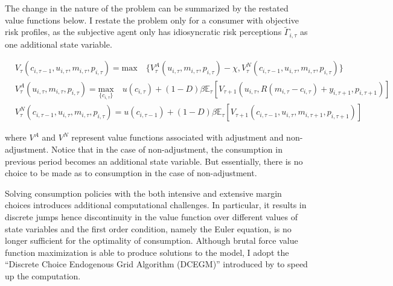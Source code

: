 The change in the nature of the problem can be summarized by the restated value functions below. I restate the problem only for a consumer with objective risk profiles, as the subjective agent only has idiosyncratic risk perceptions $\tilde \Gamma_{i,\tau}$ as one additional state variable. 

\begin{equation}
\begin{split}
& V_{\tau}(c_{i,\tau-1},u_{i,\tau}, m_{i,\tau}, p_{i,\tau}) = \textrm{max} \quad \{V^A_{\tau}(u_{i,\tau}, m_{i,\tau}, p_{i,\tau})-\chi,V^N_{\tau}(c_{i,\tau-1},u_{i,\tau}, m_{i,\tau}, p_{i,\tau})\} \\
& V^A_{\tau}(u_{i,\tau}, m_{i,\tau}, p_{i,\tau}) = \underset{\{c_{i,\tau}\}}{\textrm{max}} \quad u(c_{i,\tau}) + (1-D)\beta \mathbb{E}_{\tau}\left[V_{\tau+1}(u_{i,\tau},R(m_{i,\tau}-c_{i,\tau})+y_{i,\tau+1}, p_{i,\tau+1})\right]  \\
& V^N_{\tau}(c_{i,\tau-1},u_{i,\tau}, m_{i,\tau}, p_{i,\tau}) =  u(c_{i,\tau-1}) + (1-D)\beta \mathbb{E}_{\tau}\left[V_{\tau+1}(c_{i,\tau-1},u_{i,\tau},m_{i,\tau+1}, p_{i,\tau+1})\right]
\end{split}
\end{equation}

where $V^A$ and $V^N$ represent value functions associated with adjustment and non-adjustment. Notice that in the case of non-adjustment, the consumption in previous period becomes an additional state variable. But essentially, there is no choice to be made as to consumption in the case of non-adjustment. 

Solving consumption policies with the both intensive and extensive margin choices introduces additional computational challenges. In particular, it results in discrete jumps hence discontinuity in the value function over different values of state variables and the first order condition, namely the Euler equation, is no longer sufficient for the optimality of consumption. Although brutal force value function maximization is able to produce solutions to the model, I adopt the ``Discrete Choice Endogenous Grid Algorithm (DCEGM)'' introduced by \cite{iskhakov2017endogenous} to speed up the computation.
